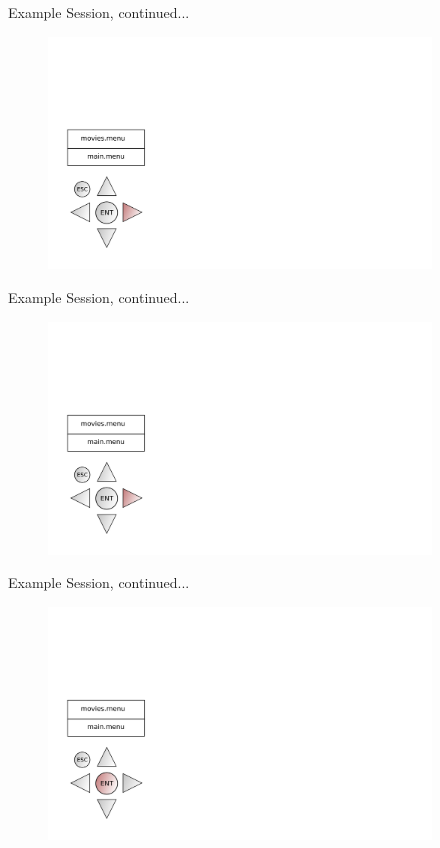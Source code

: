 \documentclass[style=smrt,mode=present,paper=screen]{powerdot}
\begin{document}
\begin{slide}[toc=,bm=]{Example Session, continued...}
\begin{figure}[htb]
	\includegraphics[width=4in]{figures/example-session-07}
\end{figure}
\end{slide}

\begin{slide}[toc=,bm=]{Example Session, continued...}
\begin{figure}[htb]
	\includegraphics[width=4in]{figures/example-session-08}
\end{figure}
\end{slide}

\begin{slide}[toc=,bm=]{Example Session, continued...}
\begin{figure}[htb]
	\includegraphics[width=4in]{figures/example-session-09}
\end{figure}
\end{slide}
\end{document}
